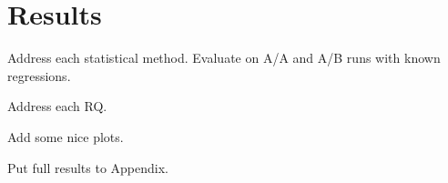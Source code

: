 \chapter{Results}
\label{chap:results}

Address each statistical method.
Evaluate on A/A and A/B runs with known regressions.

Address each RQ.

Add some nice plots.

Put full results to Appendix.
